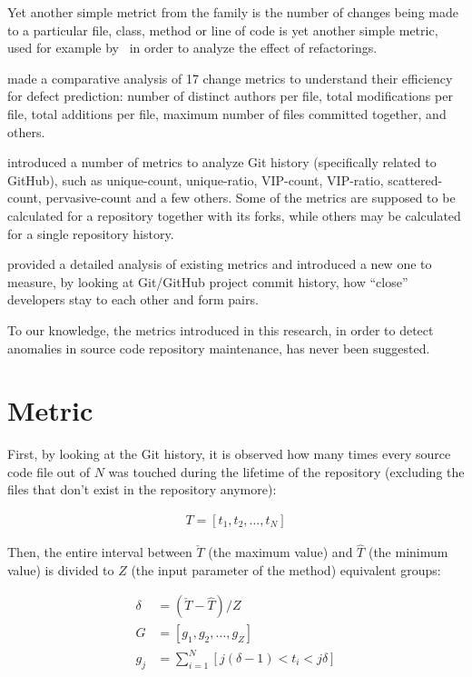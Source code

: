 \documentclass[sigconf]{acmart}
\begin{document}
Yet another simple metrict from the family is
the number of changes being made to a particular file, class, method
or line of code is yet another simple metric, used for example by~\citet{demeyer2000}
in order to analyze the effect of refactorings.

\citet{moser2008} made a comparative analysis of 17 change metrics to understand
their efficiency for defect prediction: number of distinct authors per file,
total modifications per file, total additions per file, maximum number of
files committed together, and others.

\citet{biazzini2014} introduced a number of metrics to analyze
Git history (specifically related to GitHub), such as unique-count, unique-ratio,
VIP-count, VIP-ratio, scattered-count, pervasive-count and a few others. Some
of the metrics are supposed to be calculated for a repository together with
its forks, while others may be calculated for a single repository history.

\citet{batista2018} provided a detailed analysis of existing metrics
and introduced a new one to measure, by looking at Git/GitHub project
commit history, how ``close'' developers stay to each other and form
pairs.

To our knowledge, the metrics introduced in this research, in order
to detect anomalies in source code repository maintenance, has never been
suggested.

\section{Metric}
\label{sec:method}

First, by looking at the Git history,
it is observed how many times every source code file out of $N$ was touched
during the lifetime of the repository (excluding the files that don't exist
in the repository anymore):

\begin{eqnarray}
T = [t_1, t_2, \dots, t_N]
\end{eqnarray}

Then, the entire interval between $\check{T}$ (the maximum value)
and $\hat{T}$ (the minimum value) is divided to $Z$ (the input parameter of the method)
equivalent groups:

\begin{align}
\delta &= ( \check{T} - \hat{T} ) / Z \\
G &= [g_1, g_2, \dots, g_{Z}] \\
g_j &= \sum_{i=1}^N [ j(\delta-1) < t_i < j\delta ]
\end{align}
\end{document}

